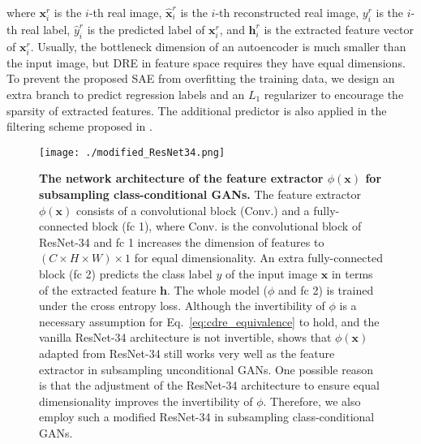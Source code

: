 \documentclass[final,12pt, 3p,times]{elsarticle}
\begin{document}
where $\bm{x}_i^r$ is the $i$-th real image, $\hat{\bm{x}}_i^r$ is the $i$-th reconstructed real image, $y_i^r$ is the $i$-th real label, $\hat{y}^r_i$ is the predicted label of $\bm{x}_i^r$, and $\bm{h}^r_i$ is the extracted feature vector of $\bm{x}_i^r$. Usually, the bottleneck dimension of an autoencoder is much smaller than the input image, but DRE in feature space \cite{ding2020subsampling} requires they have equal dimensions. To prevent the proposed SAE from overfitting the training data, we design an extra branch to predict regression labels and an $L_1$ regularizer to encourage the sparsity of extracted features. The additional predictor is also applied in the filtering scheme proposed in .



\begin{figure}[t]
	\centering
	\texttt{[image: ./modified\_ResNet34.png]}
	\caption{\textbf{The network architecture of the feature extractor $\phi(\bm{x})$ for subsampling class-conditional GANs.} The feature extractor $\phi(\bm{x})$ consists of a convolutional block (Conv.) and a fully-connected block (fc 1), where Conv. is the convolutional block of ResNet-34 and fc 1 increases the dimension of features to $(C\times H\times W)\times 1$ for equal dimensionality. An extra fully-connected block (fc 2) predicts the class label $y$ of the input image $\bm{x}$ in terms of the extracted feature $\bm{h}$. The whole model ($\phi$ and fc 2) is trained under the cross entropy loss. Although the invertibility of $\phi$ is a necessary assumption for Eq.\ \eqref{eq:cdre_equivalence} to hold, and the vanilla ResNet-34 architecture is not invertible, \cite{ding2020subsampling} shows that $\phi(\bm{x})$ adapted from ResNet-34 still works very well as the feature extractor in subsampling unconditional GANs. One possible reason is that the adjustment of the ResNet-34 architecture to ensure equal dimensionality improves the invertibility of $\phi$. Therefore, we also employ such a modified ResNet-34 in subsampling class-conditional GANs.}
	\label{fig:mod_resnet34}
\end{figure}
\end{document}
